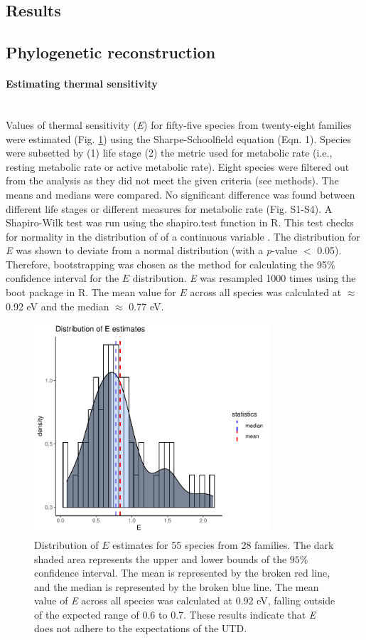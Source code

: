 \documentclass[11pt]{article}
\begin{document}
\begin{flushleft}
\section{Results}
\subsection{Phylogenetic reconstruction}
\paragraph{Estimating thermal sensitivity}\mbox{}\\
Values of thermal sensitivity (\emph{E}) for fifty-five species from twenty-eight families were estimated (Fig. \ref{fig:2}) using the Sharpe-Schoolfield equation (Eqn. 1). Species were subsetted by (1) life stage (2) the metric used for metabolic rate (i.e., resting metabolic rate or active metabolic rate). Eight species were filtered out from the analysis as they did not meet the given criteria (see methods). The means and medians were compared. No significant difference was found between different life stages or different measures for metabolic rate (Fig. S1-S4). A Shapiro-Wilk test was run using the shapiro.test function in R. This test checks for normality in the distribution of of a continuous variable \citep{SHAPIRO1965}. The distribution for \emph{E} was shown to deviate from a normal distribution (with a \emph{p}-value $<$ 0.05). Therefore, bootstrapping was chosen as the method for calculating the 95\% confidence interval for the \emph{$E$} distribution. \emph{E} was resampled 1000 times using the boot package in R. The mean value for $E$ across all species was calculated at $\approx$ 0.92 eV and the median $\approx$ 0.77 eV.
\begin{figure}[h] 
    \centering
    \includegraphics[width=3.45in]{E_DIST.pdf}
    \caption{\label{fig:2} Distribution of \emph{$E$} estimates for 55 species from 28 families. The dark shaded area represents the upper and lower bounds of the $95\%$ confidence interval. The mean is represented by the broken red line, and the median is represented by the broken blue line. The mean value of \emph{E} across all species was calculated at 0.92 eV, falling outside of the expected range of 0.6 to 0.7. These results indicate that \emph{E} does not adhere to the expectations of the UTD.}
\end{figure}
\newpage


\end{flushleft}
\end{document}
